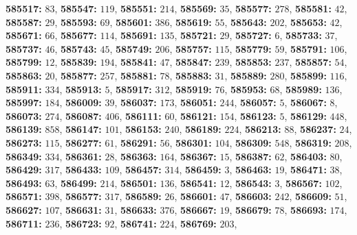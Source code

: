 \textsf{\bfseries 585517:} $83$, \textsf{\bfseries 585547:} $119$, \textsf{\bfseries 585551:} $214$, \textsf{\bfseries 585569:} $35$, \textsf{\bfseries 585577:} $278$, \textsf{\bfseries 585581:} $42$, \textsf{\bfseries 585587:} $29$, \textsf{\bfseries 585593:} $69$, \textsf{\bfseries 585601:} $386$, \textsf{\bfseries 585619:} $55$, \textsf{\bfseries 585643:} $202$, \textsf{\bfseries 585653:} $42$, \textsf{\bfseries 585671:} $66$, \textsf{\bfseries 585677:} $114$, \textsf{\bfseries 585691:} $135$, \textsf{\bfseries 585721:} $29$, \textsf{\bfseries 585727:} $6$, \textsf{\bfseries 585733:} $37$, \textsf{\bfseries 585737:} $46$, \textsf{\bfseries 585743:} $45$, \textsf{\bfseries 585749:} $206$, \textsf{\bfseries 585757:} $115$, \textsf{\bfseries 585779:} $59$, \textsf{\bfseries 585791:} $106$, \textsf{\bfseries 585799:} $12$, \textsf{\bfseries 585839:} $194$, \textsf{\bfseries 585841:} $47$, \textsf{\bfseries 585847:} $239$, \textsf{\bfseries 585853:} $237$, \textsf{\bfseries 585857:} $54$, \textsf{\bfseries 585863:} $20$, \textsf{\bfseries 585877:} $257$, \textsf{\bfseries 585881:} $78$, \textsf{\bfseries 585883:} $31$, \textsf{\bfseries 585889:} $280$, \textsf{\bfseries 585899:} $116$, \textsf{\bfseries 585911:} $334$, \textsf{\bfseries 585913:} $5$, \textsf{\bfseries 585917:} $312$, \textsf{\bfseries 585919:} $76$, \textsf{\bfseries 585953:} $68$, \textsf{\bfseries 585989:} $136$, \textsf{\bfseries 585997:} $184$, \textsf{\bfseries 586009:} $39$, \textsf{\bfseries 586037:} $173$, \textsf{\bfseries 586051:} $244$, \textsf{\bfseries 586057:} $5$, \textsf{\bfseries 586067:} $8$, \textsf{\bfseries 586073:} $274$, \textsf{\bfseries 586087:} $406$, \textsf{\bfseries 586111:} $60$, \textsf{\bfseries 586121:} $154$, \textsf{\bfseries 586123:} $5$, \textsf{\bfseries 586129:} $448$, \textsf{\bfseries 586139:} $858$, \textsf{\bfseries 586147:} $101$, \textsf{\bfseries 586153:} $240$, \textsf{\bfseries 586189:} $224$, \textsf{\bfseries 586213:} $88$, \textsf{\bfseries 586237:} $24$, \textsf{\bfseries 586273:} $115$, \textsf{\bfseries 586277:} $61$, \textsf{\bfseries 586291:} $56$, \textsf{\bfseries 586301:} $104$, \textsf{\bfseries 586309:} $548$, \textsf{\bfseries 586319:} $208$, \textsf{\bfseries 586349:} $334$, \textsf{\bfseries 586361:} $28$, \textsf{\bfseries 586363:} $164$, \textsf{\bfseries 586367:} $15$, \textsf{\bfseries 586387:} $62$, \textsf{\bfseries 586403:} $80$, \textsf{\bfseries 586429:} $317$, \textsf{\bfseries 586433:} $109$, \textsf{\bfseries 586457:} $314$, \textsf{\bfseries 586459:} $3$, \textsf{\bfseries 586463:} $19$, \textsf{\bfseries 586471:} $38$, \textsf{\bfseries 586493:} $63$, \textsf{\bfseries 586499:} $214$, \textsf{\bfseries 586501:} $136$, \textsf{\bfseries 586541:} $12$, \textsf{\bfseries 586543:} $3$, \textsf{\bfseries 586567:} $102$, \textsf{\bfseries 586571:} $398$, \textsf{\bfseries 586577:} $317$, \textsf{\bfseries 586589:} $26$, \textsf{\bfseries 586601:} $47$, \textsf{\bfseries 586603:} $242$, \textsf{\bfseries 586609:} $51$, \textsf{\bfseries 586627:} $107$, \textsf{\bfseries 586631:} $31$, \textsf{\bfseries 586633:} $376$, \textsf{\bfseries 586667:} $19$, \textsf{\bfseries 586679:} $78$, \textsf{\bfseries 586693:} $174$, \textsf{\bfseries 586711:} $236$, \textsf{\bfseries 586723:} $92$, \textsf{\bfseries 586741:} $224$, \textsf{\bfseries 586769:} $203$, 
